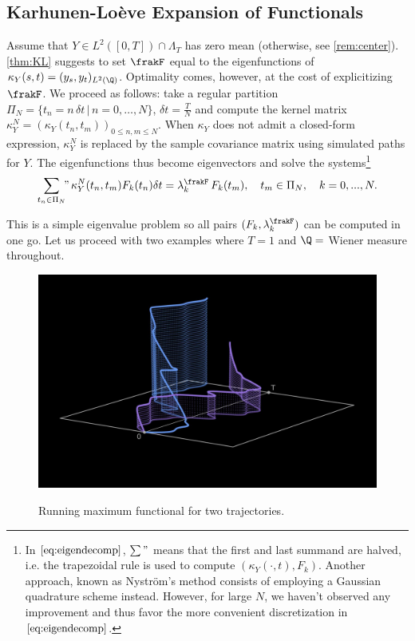 

\subsection{Karhunen-Loève Expansion of Functionals}



Assume that $Y \in L^2([0,T]) \cap \Lambda_T$ has  zero mean (otherwise, see \cref{rem:center}).   \cref{thm:KL} suggests to set  $\frakF$  equal to the eigenfunctions of  $\kappa_Y(s,t) = (y_s,y_t)_{L^2(\Q)}$. Optimality comes, however,  at the cost of explicitizing $\frakF$. We proceed as follows: take a regular partition $\Pi_N = \{t_n = n\, \delta t\, |\, n=0,\ldots,N\}$, $ \delta t =\frac{T}{N}$ and compute the kernel matrix $\kappa^{N}_Y = (\kappa_Y(t_n,t_m))_{0 \le n,m \le N}$. When $\kappa_Y$ does not admit a  closed-form expression, $\kappa^{N}_Y$ is replaced by the sample covariance matrix using simulated paths for $Y$. The eigenfunctions thus become eigenvectors and solve the systems\footnote{In  $\eqref{eq:eigendecomp}$,  $\sum"$ means that the first and last summand are halved, i.e. the trapezoidal rule is used to compute  $(\kappa_Y(\cdot,t), F_k)$. Another approach, known as Nyström's method  \cite{reinhardt} consists of   employing a Gaussian quadrature scheme instead.  
However, for large $N$,  we haven't observed any improvement 
and thus favor the more convenient discretization in  $\eqref{eq:eigendecomp}$.}
\vspace{-1mm}
\begin{equation}\label{eq:eigendecomp}
        \sum_{t_n\in  \Pi_N}\!\!" \, \kappa^{N}_{Y}(t_n,t_m) F_{k}(t_n)  \delta t = \lambda^{\frakF}_{k}\,  F_{k}(t_m), \quad t_m\in \Pi_N, \quad k=0,...,N.
\end{equation}
\vspace{-3mm}

 This is a simple eigenvalue problem so  all pairs $(F_k,\lambda_k^{\frakF})$ can be  computed in one go. Let us proceed with two examples where  $T=1$ and $\Q=$ Wiener measure throughout.

\begin{figure}[t]
    \centering
    \caption{Running maximum functional for two trajectories.}
    \vspace{-2mm}
    \includegraphics[scale =0.22]{KL/Figures/MaxDouble.JPG}
    \label{fig:max3D}
\end{figure}



